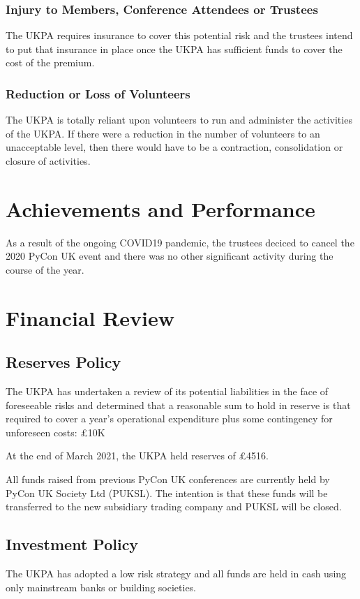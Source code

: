 \documentclass[11pt, final]{article}
\begin{document}
            \subsubsection{Injury to Members, Conference Attendees or Trustees}
            The UKPA requires insurance to cover this potential risk and the trustees intend to put that insurance in place once the UKPA has sufficient funds to cover the cost of the premium.

            \subsubsection{Reduction or Loss of Volunteers}
            The UKPA is totally reliant upon volunteers to run and administer the activities of the UKPA. If there were a reduction in the number of volunteers to an unacceptable level, then there would have to be a contraction, consolidation or closure of activities.

    \section{Achievements and Performance}
    	As a result of the ongoing COVID19 pandemic, the trustees deciced to cancel the 2020 PyCon UK event and there was no other significant activity during the course of the year.
    \section{Financial Review}

        \subsection{Reserves Policy}
		The UKPA has undertaken a review of its potential liabilities in the face of foreseeable risks and determined that a reasonable sum to hold in reserve is that required to cover a year's operational expenditure plus some contingency for unforeseen costs: \pounds10K

        At the end of March 2021, the UKPA held reserves of \pounds 4516.

        All funds raised from previous PyCon UK conferences are currently held by PyCon UK Society Ltd (PUKSL). The intention is that these funds will be transferred to the new subsidiary trading company  and PUKSL will be closed.

        \subsection{Investment Policy}
        The UKPA has adopted a low risk strategy and all funds are held in cash using only mainstream banks or building societies.
\end{document}
